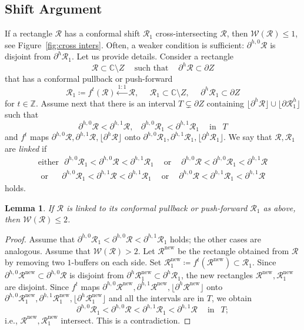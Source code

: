 \documentclass{amsart}
\renewcommand{\sp}{{\ \ }}
\newcommand{\1}{{\mathbb 1 }}
\newcommand{\reminder}[1]{\textsl{$\lhd\rhd$#1$\lhd\rhd$}\marginpar{$\lhd\rhd\lhd\rhd\lhd\rhd$}}
\newcommand{\Width}{{\mathcal W}}
\newcommand\RR{\mathcal{R}}
\newcommand\new{{\operatorname{new}}}
\newcommand{\C}{\mathbb{C}}
\newcommand{\Z}{\mathbb{Z}}
\newtheorem{lem}[thm]{Lemma}
\theoremstyle{remark}
\numberwithin{equation}{section}
\theoremstyle{definition}
\begin{document}
\subsection{Shift Argument} \label{sss:shift argum}  If a rectangle $\RR$ has a conformal shift $\RR_1$ cross-intersecting $\RR$, then $\Width(\RR)\le 1$, see Figure~\ref{fig:cross inters}. Often, a weaker condition is sufficient: $\partial^{h,0} \RR$ is disjoint from $\partial ^h \RR_1$. Let us provide details. Consider a rectangle
\[
\RR\subset \C\setminus Z\sp\sp\text{ such that }\sp\sp \partial^h \RR\subset \partial Z \]
that has a conformal pullback or push-forward 
\[
 \RR_1\coloneqq f^t(\RR) \overset{1:1}{\longleftarrow} \RR, \sp\sp\sp \RR_1\subset \C\setminus Z,\sp \sp\sp \partial^h \RR_1\subset \partial Z 
\]
for $t\in \Z$. Assume next that there is an interval $T\subsetneq \partial Z$ containing $\lfloor \partial^h \RR\rfloor\cup \lfloor \partial \RR^h_1\rfloor$ such that \[\partial^{h,0}\RR<\partial^{h,1}\RR,\sp\sp  \partial^{h,0}\RR_1<\partial^{h,1}\RR_1\sp\sp\text{ in }\sp T\]
and $f^t$ maps $\partial^{h,0}\RR, \partial^{h,1}\RR, \lfloor \partial ^h \RR\rfloor$ onto  $\partial^{h,0}\RR_1, \partial^{h,1}\RR_1, \lfloor \partial ^h \RR_1\rfloor$. We say that $\RR, \RR_1$ are \emph{linked} if
\begin{equation}
\label{eq:LinkCond}
\begin{matrix}
\text{either} \ \sp \partial ^{h,0} \RR_1 <\partial^{h,0} \RR< \partial^{h,1} \RR_1 \sp\sp\text{ or }\sp\sp \partial ^{h,0} \RR <\partial^{h,0} \RR_1< \partial^{h,1} \RR \\
\text{ or }\sp\sp\sp
\partial ^{h,0} \RR_1 <\partial^{h,1} \RR< \partial^{h,1} \RR_1 \sp\sp\text{ or }\sp\sp \partial ^{h,0} \RR <\partial^{h,1} \RR_1< \partial^{h,1} \RR
\end{matrix}
\end{equation}
holds.
 



\begin{lem}
\label{lem:shift argum}
If $\RR$ is linked to its conformal pullback or push-forward $\RR_1$ as above, then $\Width(\RR)\le 2$.
\end{lem}
\begin{proof}
Assume that $ \partial ^{h,0} \RR_1 <\partial^{h,0} \RR< \partial^{h,1} \RR_1 $ holds; the other cases are analogous. Assume that $\Width(\RR)> 2$. Let $\RR^\new$ be the rectangle obtained from $\RR$ by removing two $1$-buffers on each side. Set $\RR^\new_1\coloneqq f^t(\RR^\new)\subset \RR_1$. Since $\partial ^{h,0}\RR^\new\subset \partial^{h,0}\RR$ is disjoint from $\partial^h\RR^\new_1\subset \partial^{h}\RR_1$, the new rectangles $\RR^\new,\RR^\new_1$ are disjoint. Since $f^t$ maps $\partial^{h,0}\RR^\new, \partial^{h,1}\RR^\new, \lfloor \partial ^h \RR^\new\rfloor$ onto  $\partial^{h,0}\RR^\new_1, \partial^{h,1}\RR^\new_1, \lfloor \partial ^h \RR^\new_1\rfloor$ and all the intervals are in $T$, we obtain 
\[ \partial ^{h,0} \RR_1 <\partial^{h,0} \RR< \partial^{h,1} \RR_1<\partial ^{h,1}\RR \sp\sp\text{ in }\sp T;\] i.e., $\RR^\new, \RR^\new_1$ intersect. This is a contradiction.
\end{proof}
\end{document}
